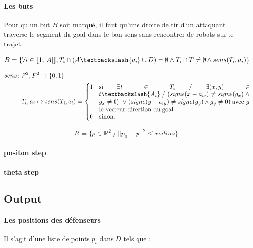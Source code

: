 \documentclass{article}
\begin{document}
\paragraph{Les buts} Pour qu'un but $B$ soit marqué, il faut qu'une droite de tir d'un attaquant traverse le segment du goal dans le bon sens sans rencontrer de robots sur le trajet.

\begin{equation}
    B = \{ \forall i \in \llbracket 1, |A| \rrbracket, T_i \cap (A \textbackslash \{a_i\} \cup D) = \emptyset \wedge T_i \cap T \ne \emptyset \wedge sens(T_i, a_i) \}
\end{equation}

\begin{align*}
  sens \colon & F^2, F^2\to \{0, 1 \}\\
  &T_i, a_i \mapsto sens(T_i, a_i) = \begin{cases}
                                   1 & \parbox[t]{.7\textwidth}{si $\exists t \in T_i\ / \ \exists (x, y) \in t \textbackslash \{A_i \} \ / \ (signe(x-a_{ix}) \ne signe(g_x) \wedge g_x \ne 0) \ \vee (signe(y-a_{iy}) \ne signe(g_y) \wedge g_y \ne 0)$ avec $g$ le vecteur direction du goal} \\
                                   0 & \text{sinon.}
  \end{cases}
\end{align*}




\begin{equation*}
    R = \{ p \in \mathbb{R}^2 \ /\  ||p_0 - p||^2 \leqslant radius \}.
\end{equation*}

\paragraph{positon step}

\paragraph{theta step}

\subsection{Output}

\paragraph{Les positions des défenseurs} Il s'agit d'une liste de points $p_i$ dans $D$ tels que :
\end{document}
